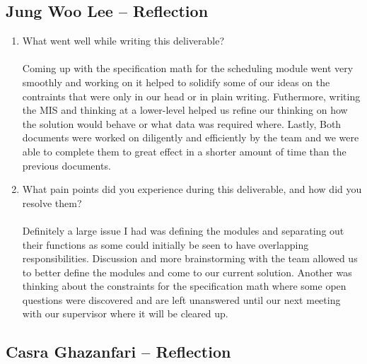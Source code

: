 \documentclass[12pt, titlepage]{article}
\begin{document}
\subsection*{Jung Woo Lee -- Reflection}

\begin{enumerate}
  \item What went well while writing this deliverable?\\\\
  Coming up with the specification math for the scheduling module went very smoothly and working on it 
  helped to solidify some of our ideas on the contraints that were only in our head or in plain 
  writing. Futhermore, writing the MIS and thinking at a lower-level helped us refine our thinking on
  how the solution would behave or what data was required where. Lastly, Both documents were worked 
  on diligently and efficiently by the team and we were able to complete them to great effect in a 
  shorter amount of time than the previous documents.  
  \item What pain points did you experience during this deliverable, and how
  did you resolve them?\\\\
  Definitely a large issue I had was defining the modules and separating out their functions as some
  could initially be seen to have overlapping responsibilities. Discussion and more brainstorming with
  the team allowed us to better define the modules and come to our current solution. Another was thinking 
  about the constraints for the specification math where some open questions were discovered and are 
  left unanswered until our next meeting with our supervisor where it will be cleared up.  
\end{enumerate}

\subsection*{Casra Ghazanfari -- Reflection}
\end{document}

